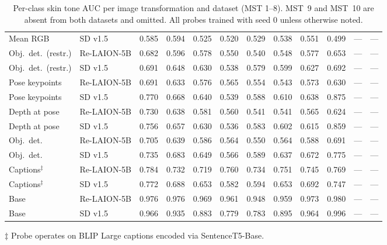 \begin{table}[htbp]
\begin{threeparttable}
{\begin{tabular}{llcccccccccc}
				Mean RGB              & SD v1.5          & 0.585         & 0.594         & 0.525 & 0.520 & 0.529 & 0.538 & 0.551 & 0.499 & --- & --- \\
				Obj.\ det.\ (restr.)  & Re-LAION-5B      & 0.682         & 0.596         & 0.578 & 0.550 & 0.540 & 0.548 & 0.577 & 0.653 & --- & --- \\
				Obj.\ det.\ (restr.)  & SD v1.5          & 0.691         & 0.648         & 0.630 & 0.538 & 0.579 & 0.599 & 0.627 & 0.692 & --- & --- \\
				Pose keypoints        & Re-LAION-5B      & 0.691         & 0.633         & 0.576 & 0.565 & 0.554 & 0.543 & 0.573 & 0.630 & --- & --- \\
				Pose keypoints        & SD v1.5          & 0.770         & 0.668         & 0.640 & 0.539 & 0.588 & 0.610 & 0.638 & 0.875 & --- & --- \\
				Depth at pose         & Re-LAION-5B      & 0.730         & 0.638         & 0.581 & 0.560 & 0.541 & 0.541 & 0.565 & 0.624 & --- & --- \\
				Depth at pose         & SD v1.5          & 0.756         & 0.657         & 0.630 & 0.536 & 0.583 & 0.602 & 0.615 & 0.859 & --- & --- \\
				Obj.\ det.            & Re-LAION-5B      & 0.705         & 0.639         & 0.586 & 0.564 & 0.550 & 0.564 & 0.588 & 0.691 & --- & --- \\
				Obj.\ det.            & SD v1.5          & 0.735         & 0.683         & 0.649 & 0.566 & 0.589 & 0.637 & 0.672 & 0.775 & --- & --- \\
				Captions$^\ddagger$   & Re-LAION-5B      & 0.784         & 0.732         & 0.719 & 0.760 & 0.734 & 0.751 & 0.745 & 0.769 & --- & --- \\
				Captions$^\ddagger$   & SD v1.5          & 0.772         & 0.688         & 0.653 & 0.582 & 0.594 & 0.653 & 0.692 & 0.747 & --- & --- \\
				Base                  & Re-LAION-5B      & 0.976         & 0.976         & 0.969 & 0.961 & 0.948 & 0.959 & 0.973 & 0.980 & --- & --- \\
				Base                  & SD v1.5          & 0.966         & 0.935         & 0.883 & 0.779 & 0.783 & 0.895 & 0.964 & 0.996 & --- & --- \\
				\bottomrule
			\end{tabular}}
		\begin{tablenotes}
			\footnotesize
			\item[$\ddagger$] Probe operates on BLIP Large captions encoded via SentenceT5-Base.
		\end{tablenotes}
	\end{threeparttable}
	\caption{Per-class skin tone AUC per image transformation and dataset
		(MST 1--8). MST~9 and MST~10 are absent from both datasets and omitted.
		All probes trained with seed 0 unless otherwise noted.}
	\label{tab:skintone_separability_perclass}
\end{table}

